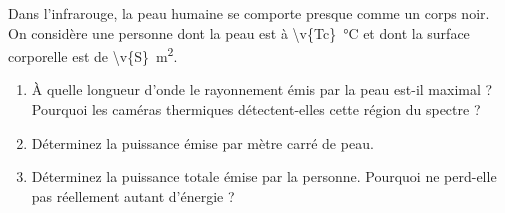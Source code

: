Dans l'infrarouge, la peau humaine se comporte presque comme un corps noir. On considère une personne dont la peau est à \qty{\v{Tc}}{\degreeCelsius} et dont la surface corporelle est de \qty{\v{S}}{m^2}.

\begin{enumerate}[label=\alph*)]
    \item À quelle longueur d'onde le rayonnement émis par la peau est-il maximal ? Pourquoi les caméras thermiques détectent-elles cette région du spectre ?
    \item Déterminez la puissance émise par mètre carré de peau.
    \item Déterminez la puissance totale émise par la personne. Pourquoi ne perd-elle pas réellement autant d'énergie ?
\end{enumerate}

